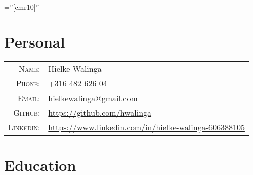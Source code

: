 \documentclass[a4paper,10pt]{article} %
\begin{document}
\pagestyle{empty} %

\font\fb=''[cmr10]'' %


\par{\bigskip\par} %

\section{Personal}

\begin{tabular}{rl}
\textsc{Name:} & Hielke Walinga \\
\textsc{Phone:} & +316 482 626 04 \\
\textsc{Email:} & \href{mailto:hielkewalinga@gmail.com}{hielkewalinga@gmail.com} \\
\textsc{Github:} & \href{https://github.com/hwalinga}{https://github.com/hwalinga} \\
\textsc{Linkedin:} & \href{https://www.linkedin.com/in/hielke-walinga-606388105}{https://www.linkedin.com/in/hielke-walinga-606388105}
\end{tabular}



\section{Education}
\end{document}
